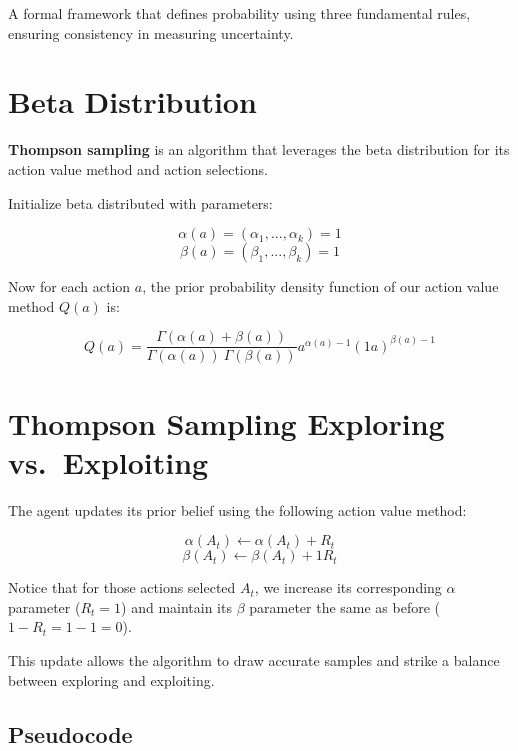 \documentclass[
  letterpaper,
  DIV=11,
  numbers=noendperiod]{scrreprt}
\begin{document}
\begin{tcolorbox}[enhanced jigsaw, colback=white, left=2mm, breakable, opacityback=0, bottomrule=.15mm, rightrule=.15mm, arc=.35mm, colframe=quarto-callout-note-color-frame, leftrule=.75mm, toprule=.15mm]

A formal framework that defines probability using three fundamental
rules, ensuring consistency in measuring uncertainty. 🎲

\end{tcolorbox}

\section{Beta Distribution}\label{beta-distribution-1}

\textbf{Thompson sampling} is an algorithm that leverages the beta
distribution for its action value method and action selections.

Initialize beta distributed with parameters:

\[
\alpha(a) = (\alpha_{1}, . . . , \alpha_{k}) = 1
\] \[
\beta(a) = (\beta_{1}, . . . , \beta_{k}) = 1
\]

Now for each action \(a\), the prior probability density function of our
action value method \(Q(a)\) is:

\[
  Q(a) = \frac{\Gamma(\alpha(a) + \beta(a))}{\Gamma(\alpha(a)) \ \Gamma(\beta(a))} a^{\alpha(a)-1} (1 a)^{\beta(a)-1}
\]

\section{Thompson Sampling Exploring
vs.~Exploiting}\label{thompson-sampling-exploring-vs.-exploiting}

The agent updates its prior belief using the following action value
method:

\[
\alpha(A_{t}) \gets \alpha(A_{t}) + R_{t}
\] \[
\beta(A_{t}) \gets \beta(A_{t}) + 1 R_{t}
\]

Notice that for those actions selected \(A_t\), we increase its
corresponding \(\alpha\) parameter (\(R_t = 1\)) and maintain its
\(\beta\) parameter the same as before (\(1 - R_t = 1 - 1 = 0\)).

This update allows the algorithm to draw accurate samples and strike a
balance between exploring and exploiting.

\subsection{Pseudocode}\label{pseudocode-2}
\end{document}
